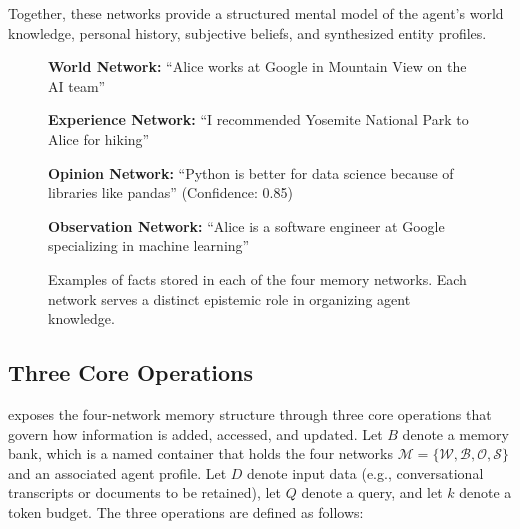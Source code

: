 Together, these networks provide a structured mental model of the agent's world knowledge, personal history, subjective beliefs, and synthesized entity profiles. 

\begin{figure}[t]
\centering
\begin{tcolorbox}[
    colback=teal!5!white,
    colframe=teal!60!black,
    fonttitle=\bfseries,
    coltitle=white,
    colbacktitle=teal!60!black,
    boxrule=0.8pt,
    arc=1mm,
    enhanced,
    width=0.95\linewidth
]
\textbf{World Network:} ``Alice works at Google in Mountain View on the AI team''

\vspace{0.3cm}

\textbf{Experience Network:} ``I recommended Yosemite National Park to Alice for hiking''

\vspace{0.3cm}

\textbf{Opinion Network:} ``Python is better for data science because of libraries like pandas'' (Confidence: 0.85)

\vspace{0.3cm}

\textbf{Observation Network:} ``Alice is a software engineer at Google specializing in machine learning''
\end{tcolorbox}

\caption{Examples of facts stored in each of the four memory networks. Each network serves a distinct epistemic role in organizing agent knowledge.}
\label{fig:four-networks}
\end{figure}


\subsection{Three Core Operations}

\our exposes the four-network memory structure through three core operations that govern how information is added, accessed, and updated. Let $B$ denote a memory bank, which is a named container that holds the four networks $\mathcal{M} = \{\mathcal{W}, \mathcal{B}, \mathcal{O}, \mathcal{S}\}$ and an associated agent profile. Let $D$ denote input data (e.g., conversational transcripts or documents to be retained), let $Q$ denote a query, and let $k$ denote a token budget. The three operations are defined as follows: 

